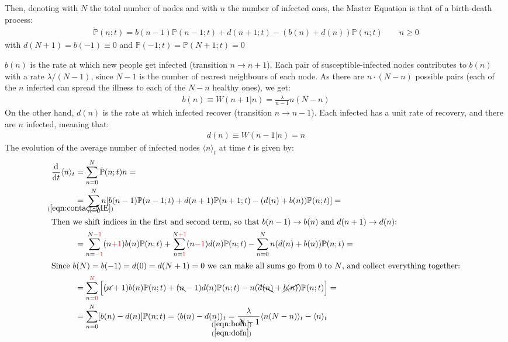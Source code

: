 \documentclass[../../main.tex]{subfiles}
\begin{document}
\medskip

Then, denoting with $N$ the total number of nodes and with $n$ the number of infected ones, the Master Equation is that of a birth-death process:
\begin{align}\label{eqn:contact-ME}
    \dot{\mathbb{P}}(n;t) = b(n-1) \mathbb{P}(n-1;t) + d(n+1;t) - (b(n) + d(n)) \mathbb{P}(n;t) \qquad n \geq 0
\end{align}
with $d(N+1) = b(-1) \equiv 0$ and  $\mathbb{P}(-1;t) = \mathbb{P}(N+1;t) = 0$

\medskip

$b(n)$ is the rate at which new people get infected (transition $n \to n+1$).
Each pair of susceptible-infected nodes contributes to $b(n)$ with a rate $\lambda/(N-1)$, since $N-1$ is the number of nearest neighbours of each node. As there are $n \cdot (N-n)$ possible pairs (each of the $n$ infected can spread the illness to each of the $N-n$ healthy ones), we get:
\begin{align}\label{eqn:bofn}
    b(n) \equiv W(n+1|n) = \frac{\lambda}{n-1} n (N-n) 
\end{align}
On the other hand, $d(n)$ is the rate at which infected recover (transition $n \to n-1$). Each infected has a unit rate of recovery, and there are $n$ infected, meaning that:
\begin{align}\label{eqn:dofn}
    d(n) \equiv W(n-1|n) = n
\end{align}
The evolution of the average number of infected nodes $\langle n \rangle_t$ at time $t$ is given by:
\begin{align*}
    \dv{t} \langle n \rangle_t &= \sum_{n=0}^N \dot{\mathbb{P}}(n;t) n =\\
    &\underset{\mathclap{(\ref{eqn:contact-ME})}}{=} \> \sum_{n=0}^N n [b(n-1) \mathbb{P}(n-1;t) + d(n+1)\mathbb{P}(n+1;t) - (d(n) + b(n)) \mathbb{P}(n;t)] =\\
\intertext{Then we shift indices in the first and second term, so that $b(n-1) \to b(n)$ and $d(n+1) \to d(n)$:}
    &= \sum_{n=\textcolor{Red}{-1}}^{N\textcolor{Red}{-1}} (n\textcolor{Red}{+1}) b(n) \mathbb{P}(n;t) + \sum_{n=\textcolor{Red}{1}}^{N\textcolor{Red}{+1}} (n\textcolor{Red}{-1}) d(n) \mathbb{P}(n;t) - \sum_{n=0}^N n(d(n) + b(n)) \mathbb{P}(n;t) =\\
\intertext{Since $b(N) = b(-1) = d(0) = d(N+1) = 0$ we can make all sums go from $0$ to $N$, and collect everything together:}
    &= \sum_{n=\textcolor{Red}{0}}^{\textcolor{Red}{N}} \Big[ (\cancel{n}+1) b(n) \mathbb{P}(n;t) + (\bcancel{n}-1) d(n) \mathbb{P}(n;t) - n(\bcancel{d(n)} + \cancel{b(n)}) \mathbb{P}(n;t) \Big] =\\
    &= \sum_{n=0}^N [b(n) - d(n)] \mathbb{P}(n;t) = \langle b(n) - d(n) \rangle_t \underset{\mathclap{\substack{(\ref{eqn:bofn})\\(\ref{eqn:dofn})}}}{=} \frac{\lambda}{N-1} \langle n(N-n) \rangle _t - \langle n \rangle_t
\end{align*}
\end{document}
